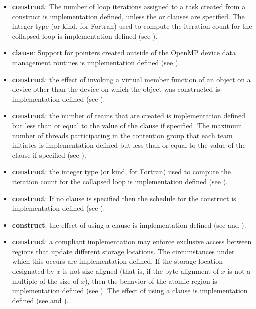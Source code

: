 \begin{itemize}
\item {} \textbf{construct}: The number of loop
  iterations assigned to a task created from a 
  construct is implementation defined, unless the  or
   clauses are specified. The integer type (or kind,
  for Fortran) used to compute the iteration count for the collapsed
  loop is implementation defined (see ).

\item {} \textbf{clause}:
  Support for pointers created outside of the OpenMP device data management
  routines is implementation defined (see ).

\item {} \textbf{construct}: the effect of invoking a virtual member
function of an object on a device other than the device on which the object was
constructed is implementation defined (see ).

\item {} \textbf{construct}: the number of teams that are created is implementation defined but
less than or equal to the value of the  clause if specified. The maximum
number of threads participating in the contention group that each team initiates is
implementation defined but less than or equal to the value of the 
clause if specified (see ).

\item {} \textbf{construct}: the integer type (or kind, for
    Fortran) used to compute the iteration count for the collapsed loop is
    implementation defined (see ).

\item {} \textbf{construct}: If no  clause is specified then the schedule for the 
construct is implementation defined (see ).

\item {} \textbf{construct}: the effect of using a 
clause is implementation defined (see  and ).

\item {} \textbf{construct}: a compliant implementation may enforce exclusive access
between  regions that update different storage locations. The circumstances
under which this occurs are implementation defined. If the storage location
designated by $x$ is not size-aligned (that is, if the byte alignment of $x$ is not a multiple
of the size of $x$), then the behavior of the atomic region is implementation defined
(see ).
The effect of using a  clause is implementation defined (see  and ).


\end{itemize}
